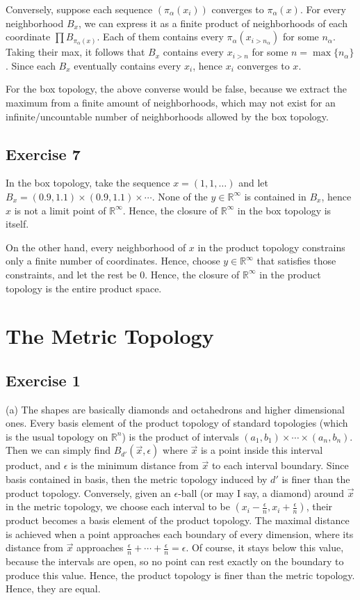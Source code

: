 \documentclass{book}
\begin{document}
Conversely, suppose each sequence $(\pi_\alpha (x_i))$ converges to $\pi_\alpha(x)$. For every neighborhood $B_x$, we can express it as a finite product of neighborhoods of each coordinate $\prod B_{\pi_\alpha (x)}$. Each of them contains every $\pi_\alpha (x_{i > n_\alpha})$ for some $n_\alpha$. Taking their max, it follows that $B_x$ contains every $x_{i > n}$ for some $n = \max \{ n_\alpha \}$. Since each $B_x$ eventually contains every $x_i$, hence $x_i$ converges to $x$.

For the box topology, the above converse would be false, because we extract the maximum from a finite amount of neighborhoods, which may not exist for an infinite/uncountable number of neighborhoods allowed by the box topology.

\subsection*{Exercise 7}
In the box topology, take the sequence $x = (1, 1, \ldots)$ and let $B_x = (0.9, 1.1) \times (0.9, 1.1) \times \cdots$. None of the $y \in \mathbb{R}^\infty$ is contained in $B_x$, hence $x$ is not a limit point of $\mathbb{R}^\infty$. Hence, the closure of $\mathbb{R}^\infty$ in the box topology is itself.

On the other hand, every neighborhood of $x$ in the product topology constrains only a finite number of coordinates. Hence, choose $y \in \mathbb{R}^\infty$ that satisfies those constraints, and let the rest be $0$. Hence, the closure of $\mathbb{R}^\infty$ in the product topology is the entire product space.

\section{The Metric Topology}

\subsection*{Exercise 1}
(a)
The shapes are basically diamonds and octahedrons and higher dimensional ones. Every basis element of the product topology of standard topologies (which is the usual topology on $\mathbb{R}^n$) is the product of intervals $(a_1, b_1) \times \cdots \times (a_n, b_n)$. Then we can simply find $B_{d'}(\vec{x}, \epsilon)$ where $\vec{x}$ is a point inside this interval product, and $\epsilon$ is the minimum distance from $\vec{x}$ to each interval boundary. Since basis contained in basis, then the metric topology induced by $d'$ is finer than the product topology. Conversely, given an $\epsilon$-ball (or may I say, a diamond) around $\vec{x}$ in the metric topology, we choose each interval to be $(x_i - \frac{\epsilon}{n}, x_i + \frac{\epsilon}{n})$, their product becomes a basis element of the product topology. The maximal distance is achieved when a point approaches each boundary of every dimension, where its distance from $\vec{x}$ approaches $\frac{\epsilon}{n} + \cdots + \frac{\epsilon}{n} = \epsilon$. Of course, it stays below this value, because the intervals are open, so no point can rest exactly on the boundary to produce this value. Hence, the product topology is finer than the metric topology. Hence, they are equal.
\end{document}
